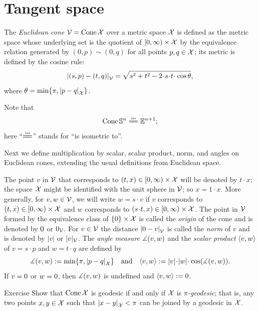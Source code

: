 \section{Tangent space}\label{sec: tangent space}

The \emph{Euclidean cone} $\mathcal{V}=\mathop{\rm Cone}\nolimits\mathcal{X}$
over a metric space $\mathcal{X}$
is defined as the metric space whose underlying set is the quotient of $[0,\infty)\times\mathcal{X}$ by the equivalence relation generated by $(0,p)\sim (0,q)$ for all points $p,q\in\mathcal{X}$;
its metric is defined by the cosine rule:
\[
\dist{(s,p)}{(t,q)}{\spc{V}} 
=
\sqrt{s^2+t^2-2\cdot s\cdot t\cdot \cos\theta},
\]
where $\theta= \min\{\pi, \dist{p}{q}{\spc{X}}\}$.

Note that
\[\Cone\SSS^n\iso\EE^{n+1};\]
here ``$\iso$'' stands for ``is isometric to''.

Next we define multiplication by scalar, scalar product, norm, and angles on Euclidean cones, extending the usual definitions from Euclidean space.

The point $v$ in $\mathcal{V}$ that corresponds to $(t,x)\z\in[0,\infty)\times \spc{X}$ will be denoted by $t\cdot x$;
the space $\mathcal{X}$ might be identified with the unit sphere in $\mathcal{V}$; so $x=1\cdot x$.
More generally, for $v,w\in \mathcal{V}$, we will write $w=s\cdot v$ if $v$ corresponds to $(t,x)\z\in[0,\infty)\times \spc{X}$ and $w$ corresponds to $(s\cdot t,x)\z\in[0,\infty)\times \spc{X}$.
The point in $\mathcal{V}$ formed by the equivalence class of $\{0\}\times\mathcal{X}$ is called the \emph{origin} of the cone and is denoted by $0$ or $0_{\mathcal{V}}$.
For $v\in\mathcal{V}$ the distance $\dist{\0}{v}{\spc{V}}$ is called the \emph{norm} of $v$ and is denoted by $|v|$ or $|v|_{\mathcal{V}}$.
The \emph{angle measure}  $\measuredangle(v,w)$ and the  \emph{scalar product} $\langle v,w\rangle$
of $v=s\cdot p$ and $w=t\cdot q$
are defined by 
\[
\mangle(v,w)\df\min\{\pi, \dist{p}{q}{\spc{X}}\}
\quad\text{and}\quad
\<v,w\>
\df |v|\cdot|w|\cdot\cos(\mangle(v,w)).
\]
If $v=0$ or $w=0$, then $\measuredangle(v,w)$ is undefined and $\langle v,w\rangle\mathrel{:=}0$.

\begin{thm}{Exercise}\label{ex:geodesic-cone}
Show that $\mathop{\rm Cone}\nolimits\mathcal{X}$ is geodesic if and only if $\mathcal{X}$ is \emph{$\pi$-geodesic};
that is, any two points $x,y\in \mathcal{X}$ such that $\dist{x}{y}{\spc{X}}<\pi$ can be joined by a geodesic in $\mathcal{X}$.
\end{thm}

